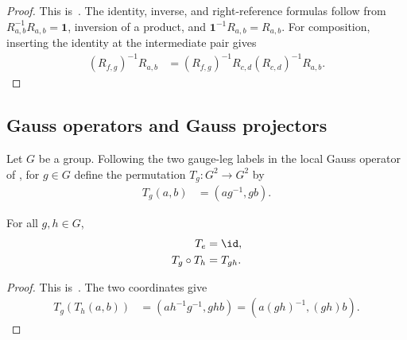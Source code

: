 \begin{proof}\leanok
    This is~\cite[``Identity, inverse, composition, and right-reference
        laws'']{QICLean2026Blueprint}.
    The identity, inverse, and right-reference formulas follow from
    $R_{a,b}^{-1}R_{a,b}=\mathbf 1$, inversion of a product, and
    $\mathbf 1^{-1}R_{a,b}=R_{a,b}$. For composition, inserting the identity at
    the intermediate pair gives
    \begin{align}
        (R_{f,g})^{-1}R_{a,b}
         & =(R_{f,g})^{-1}R_{c,d}(R_{c,d})^{-1}R_{a,b}.
    \end{align}
\end{proof}

\subsection{Gauss operators and Gauss projectors}

\begin{definition}
    \label{def:mpug_gauss_leg_action}
    \leanok
    Let $G$ be a group. Following the two gauge-leg labels in the local Gauss
    operator of \cite[lines~3380--3387]{FrancoRubio2025MPUGauging}, for
    $g\in G$ define the permutation $T_g\colon G^2\to G^2$ by
    \begin{align}
        T_g(a,b) & =\left(ag^{-1},gb\right).
        \label{eq:mpug_gauss_leg_action}
    \end{align}
\end{definition}

\begin{lemma}
    \label{thm:mpug_gauss_leg_action_mul}
    \leanok
    For all $g,h\in G$,
    \begin{align}
        T_e          & =\id,    \\
        T_g\circ T_h & =T_{gh}.
        \label{eq:mpug_gauss_leg_action_mul}
    \end{align}
\end{lemma}

\begin{proof}\leanok
    This is~\cite[``Composition of the Gauss action'']{QICLean2026Blueprint}.
    The two coordinates give
    \begin{align}
        T_g(T_h(a,b))
         & =\left(ah^{-1}g^{-1},ghb\right)
        =\left(a(gh)^{-1},(gh)b\right).
    \end{align}
\end{proof}

